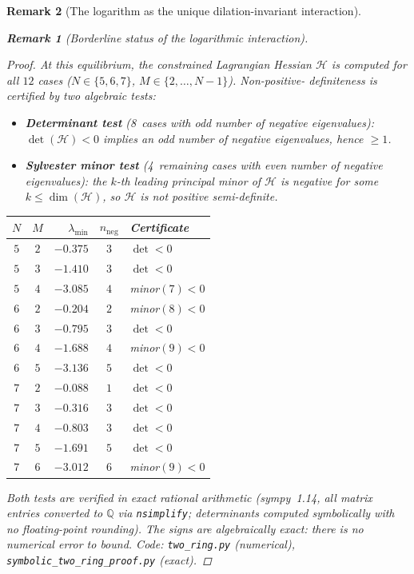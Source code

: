 \documentclass[12pt, a4paper]{article}
\newtheorem{remark}{Remark}[section]
\numberwithin{equation}{section}
\begin{document}
\begin{remark}[The logarithm as the unique dilation-invariant interaction]
\begin{remark}[Borderline status of the logarithmic interaction]
\begin{proof}
At this equilibrium, the constrained Lagrangian Hessian $\mathcal{H}$
is computed for all $12$ cases
($N \in \{5,6,7\}$, $M \in \{2,\ldots,N{-}1\}$).  Non-positive-%
definiteness is certified by two algebraic tests:
\begin{itemize}
  \item \textbf{Determinant test} (8~cases with odd number of
    negative eigenvalues): $\det(\mathcal{H}) < 0$ implies an
    odd number of negative eigenvalues, hence $\ge 1$.
  \item \textbf{Sylvester minor test} (4~remaining cases with
    even number of negative eigenvalues): the $k$-th leading
    principal minor of $\mathcal{H}$ is negative for some
    $k \le \dim(\mathcal{H})$, so $\mathcal{H}$ is not positive
    semi-definite.
\end{itemize}
\begin{center}
\begin{tabular}{ccrcl}
\toprule
$N$ & $M$ & $\lambda_{\min}$ & $n_{\mathrm{neg}}$ & Certificate \\
\midrule
$5$ & $2$ & $-0.375$ & $3$ & $\det < 0$ \\
$5$ & $3$ & $-1.410$ & $3$ & $\det < 0$ \\
$5$ & $4$ & $-3.085$ & $4$ & minor$(7) < 0$ \\
$6$ & $2$ & $-0.204$ & $2$ & minor$(8) < 0$ \\
$6$ & $3$ & $-0.795$ & $3$ & $\det < 0$ \\
$6$ & $4$ & $-1.688$ & $4$ & minor$(9) < 0$ \\
$6$ & $5$ & $-3.136$ & $5$ & $\det < 0$ \\
$7$ & $2$ & $-0.088$ & $1$ & $\det < 0$ \\
$7$ & $3$ & $-0.316$ & $3$ & $\det < 0$ \\
$7$ & $4$ & $-0.803$ & $3$ & $\det < 0$ \\
$7$ & $5$ & $-1.691$ & $5$ & $\det < 0$ \\
$7$ & $6$ & $-3.012$ & $6$ & minor$(9) < 0$ \\
\bottomrule
\end{tabular}
\end{center}
Both tests are verified in \emph{exact rational arithmetic}
(sympy~1.14, all matrix entries converted to $\mathbb{Q}$ via
\texttt{nsimplify}; determinants computed symbolically with no
floating-point rounding).  The signs are algebraically exact:
there is no numerical error to bound.  Code:
\texttt{two\_ring.py} (numerical),
\texttt{symbolic\_two\_ring\_proof.py} (exact).


\end{proof}
\end{remark}
\end{remark}
\end{document}
